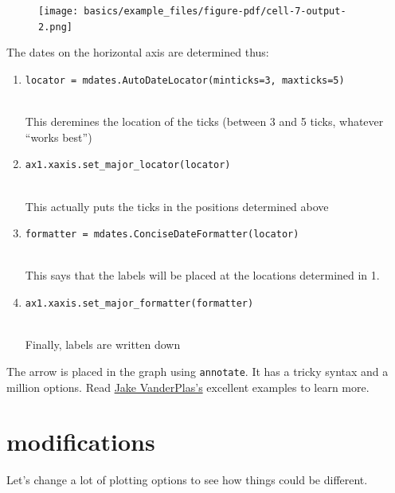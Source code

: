 \documentclass[
  letterpaper,
  DIV=11,
  numbers=noendperiod,
  oneside]{scrreprt}
\providecommand{\tightlist}{%
  \setlength{\itemsep}{0pt}\setlength{\parskip}{0pt}}\usepackage{longtable,booktabs,array}
\begin{document}
\begin{figure}[H]

{\centering \texttt{[image: basics/example\_files/figure-pdf/cell-7-output-2.png]}

}

\end{figure}

The dates on the horizontal axis are determined thus:

\begin{enumerate}
\def\labelenumi{\arabic{enumi}.}
\tightlist
\item
  \texttt{locator\ =\ mdates.AutoDateLocator(minticks=3,\ maxticks=5)}\strut \\
  This deremines the location of the ticks (between 3 and 5 ticks,
  whatever ``works best'')
\item
  \texttt{ax1.xaxis.set\_major\_locator(locator)}\strut \\
  This actually puts the ticks in the positions determined above
\item
  \texttt{formatter\ =\ mdates.ConciseDateFormatter(locator)}\strut \\
  This says that the labels will be placed at the locations determined
  in 1.
\item
  \texttt{ax1.xaxis.set\_major\_formatter(formatter)}\strut \\
  Finally, labels are written down
\end{enumerate}

The arrow is placed in the graph using \texttt{annotate}. It has a
tricky syntax and a million options. Read
\href{https://jakevdp.github.io/PythonDataScienceHandbook/04.09-text-and-annotation.html\#Arrows-and-Annotation}{Jake
VanderPlas's} excellent examples to learn more.

\hypertarget{modifications}{%
\section{modifications}\label{modifications}}

Let's change a lot of plotting options to see how things could be
different.
\end{document}
